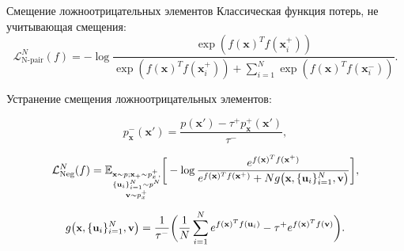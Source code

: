 \documentclass{beamer}
\begin{document}
\begin{frame}{Смещение ложноотрицательных элементов}
\small
Классическая функция потерь, не учитывающая смещения:
\[\mathcal{L}_{\text{N-pair}}^N(f) = - \log \frac{\exp(f(\mathbf{x})^T f(\mathbf{x}_i^+))}{\exp(f(\mathbf{x})^T f(\mathbf{x}_i^+)) + \sum _{i=1}^{N} \exp(f(\mathbf{x})^Tf(\mathbf{x}_i^-))}.\]

Устранение смещения ложноотрицательных элементов:

\[p_\mathbf{x}^-(\mathbf{x}') = \frac{p(\mathbf{x}') - \tau^+ p^+_\mathbf{x}(\mathbf{x}')}{\tau^-},\]

\begin{equation*} \small
\mathcal{L}_{\text{Neg}}^{N}(f) = \mathbb{E}_{\substack{\textbf{x} \sim p; \textbf{x}_+ \sim p_x^+,\\ \{\textbf{u}_i\}_{i=1}^N \sim p^N \\ \textbf{v} \sim p_x^+}}  \bigg[ -\log \frac{e^{f(\textbf{x})^T f(\textbf{x}^+)} }{e^{f(\textbf{x})^T f(\textbf{x}^+)} + N g\big(\textbf{x}, \{\textbf{u}_i\}_{i=1}^N, \textbf{v}\big)} \bigg],
\end{equation*}

\begin{equation*} \small
g\big(\textbf{x}, \{\textbf{u}_i\}_{i=1}^N, \textbf{v}\big) = \frac{1}{\tau^-}\bigg(\frac{1}{N} \sum \limits_{i=1}^N e^{f(\textbf{x})^T f(\textbf{u}_i)} - \tau^+ e^{f(\textbf{x})^T f(\textbf{v})}\bigg).
\end{equation*}
\end{frame}
\end{document}

